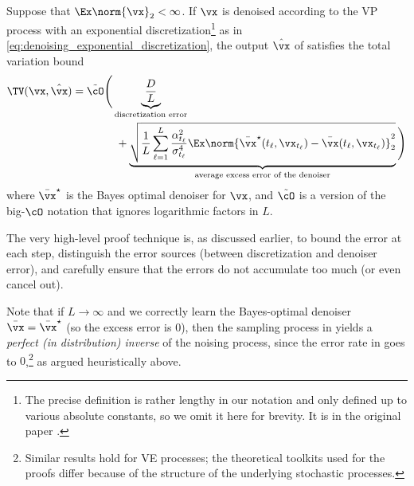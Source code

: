 \documentclass[../../book-main.tex]{subfiles}
\begin{document}
\begin{theorem}\label{thm:diffusion_sampler_convergence}
    Suppose that \(\Ex\norm{\vx}_{2} < \infty\).  If \(\vx\) is
    denoised according to the VP process with an exponential
    discretization\footnote{The precise definition is rather lengthy
        in our notation and only defined up to various absolute
        constants, so we omit it here for brevity. It is in the
    original paper \citep{li2024d}.} as in
    \eqref{eq:denoising_exponential_discretization}, the output
    \(\hat{\vx}\) of  satisfies the
    total variation bound
    \begin{align}\label{eq:diffusion_sampling_error}
        \TV(\vx, \hat{\vx})
        &= \tilde{\cO}\Bigg(\underbrace{\frac{D}{L}}_{\text{discretization
            error}} \\
            & \qquad \qquad + \underbrace{\sqrt{\frac{1}{L}\sum_{\ell =
                    1}^{L}\frac{\alpha_{t_{\ell}}^{2}}{\sigma_{t_{\ell}}^{4}}\Ex\norm{\bar{\vx}^{\star}(t_{\ell},
                        \vx_{t_{\ell}}) - \bar{\vx}(t_{\ell},
            \vx_{t_{\ell}})}_{2}^{2}}}_{\text{average excess error of
        the denoiser}}\Bigg)\nonumber
    \end{align}
    where \(\bar{\vx}^{\star}\) is the Bayes optimal denoiser for
    \(\vx\), and \(\tilde{\cO}\) is a version of the big-\(\cO\)
    notation that ignores logarithmic factors in \(L\).
\end{theorem}
The very high-level proof technique is, as discussed earlier, to
bound the error at each step, distinguish the error sources (between
discretization and denoiser error), and carefully ensure that the
errors do not accumulate too much (or even cancel out).

Note that if \(L \to \infty\) and we correctly learn the Bayes-optimal
denoiser \(\bar{\vx} = \bar{\vx}^{\star}\) (so the excess error is
\(0\)), then the sampling process in
 yields a \textit{perfect (in
distribution) inverse} of the noising process, since the error rate in
 goes to
\(0\),\footnote{Similar results hold for VE processes; the theoretical
    toolkits used for the proofs differ because of the structure of the
underlying stochastic processes.} as argued heuristically above.
\end{document}
